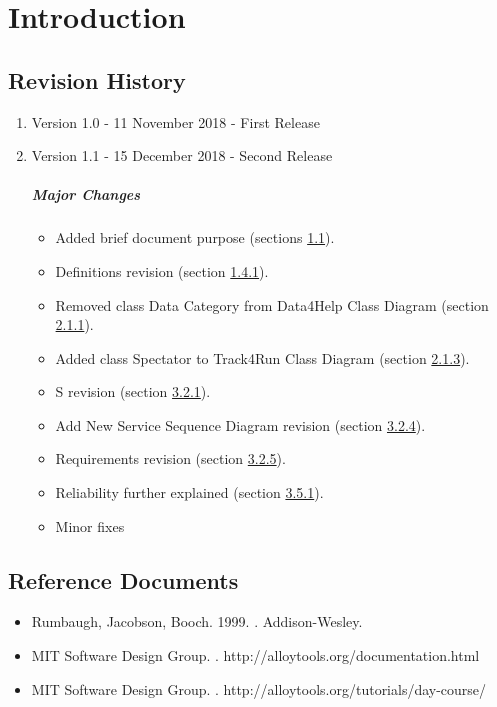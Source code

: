 \documentclass[../rasd.tex]{subfiles}
\begin{document}
\chapter{Introduction}
\thispagestyle{fancy}
		
		
		
		
		
	
		\section{Revision History}
		\begin{enumerate}
			\item Version 1.0 - 11 November 2018 - First Release
			\item Version 1.1 - 15 December 2018 - Second Release
				\paragraph{Major Changes}
				\begin{itemize}
					\item Added brief document purpose (sections \hyperref[sect:1.1]{1.1}).
					\item Definitions revision (section \hyperref[sect:1.4.1]{1.4.1}).
					\item Removed class Data Category from Data4Help Class Diagram (section \hyperref[sect:2.1.1]{2.1.1}).
					\item Added class Spectator to Track4Run Class Diagram (section \hyperref[sect:2.1.3]{2.1.3}).
					\item S revision (section \hyperref[sect:3.2.1]{3.2.1}).
					\item Add New Service Sequence Diagram revision (section \hyperref[sect:3.2.4]{3.2.4}).
					\item Requirements revision (section \hyperref[sect:3.2.5]{3.2.5}).
					\item Reliability further explained (section \hyperref[sect:3.5.1]{3.5.1}).
					\item Minor fixes
				\end{itemize}

		\end{enumerate}
		\section{Reference Documents}
			\begin{itemize}
				\item Rumbaugh, Jacobson, Booch. 1999. . Addison-Wesley.
				\item MIT Software Design Group. . http://alloytools.org/documentation.html
				\item MIT Software Design Group. . http://alloytools.org/tutorials/day-course/
			\end{itemize}
\end{document}

